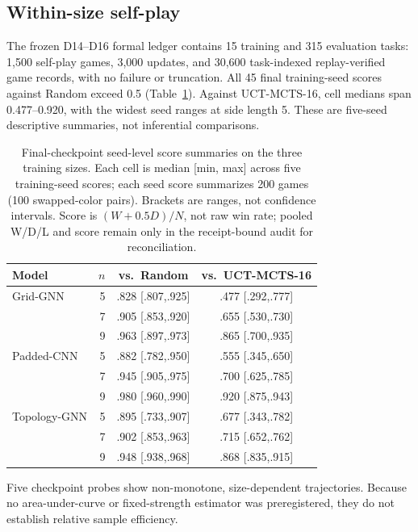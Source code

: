 \documentclass{article}
\begin{document}
\subsection{Within-size self-play}

The frozen D14--D16 formal ledger contains 15 training and 315 evaluation tasks: 1,500
self-play games, 3,000 updates, and 30,600 task-indexed replay-verified game records,
with no failure or truncation. All 45 final training-seed scores against Random
exceed 0.5 (Table~\ref{tab:final-search}). Against UCT-MCTS-16, cell medians
span 0.477--0.920, with the widest seed ranges at side length 5. These are
five-seed descriptive summaries, not inferential comparisons.

\begin{table}[H]
  \centering
  \small
  \caption{Final-checkpoint seed-level score summaries on the three training
  sizes. Each cell is median [min, max] across five training-seed scores; each
  seed score summarizes 200 games (100 swapped-color pairs). Brackets are
  ranges, not confidence intervals. Score is $(W+0.5D)/N$, not raw win rate;
  pooled W/D/L and score remain only in the receipt-bound audit for
  reconciliation.}
  \label{tab:final-search}
  \begin{tabular}{lrcc}
    \toprule
    Model & $n$ & vs.\ Random & vs.\ UCT-MCTS-16 \\
    \midrule
    Grid-GNN & 5 & .828 [.807,.925] & .477 [.292,.777] \\
             & 7 & .905 [.853,.920] & .655 [.530,.730] \\
             & 9 & .963 [.897,.973] & .865 [.700,.935] \\
    Padded-CNN & 5 & .882 [.782,.950] & .555 [.345,.650] \\
               & 7 & .945 [.905,.975] & .700 [.625,.785] \\
               & 9 & .980 [.960,.990] & .920 [.875,.943] \\
    Topology-GNN & 5 & .895 [.733,.907] & .677 [.343,.782] \\
                 & 7 & .902 [.853,.963] & .715 [.652,.762] \\
                 & 9 & .948 [.938,.968] & .868 [.835,.915] \\
    \bottomrule
  \end{tabular}
\end{table}

Five checkpoint probes show non-monotone, size-dependent trajectories. Because
no area-under-curve or fixed-strength estimator was preregistered, they do not
establish relative sample efficiency.
\end{document}
